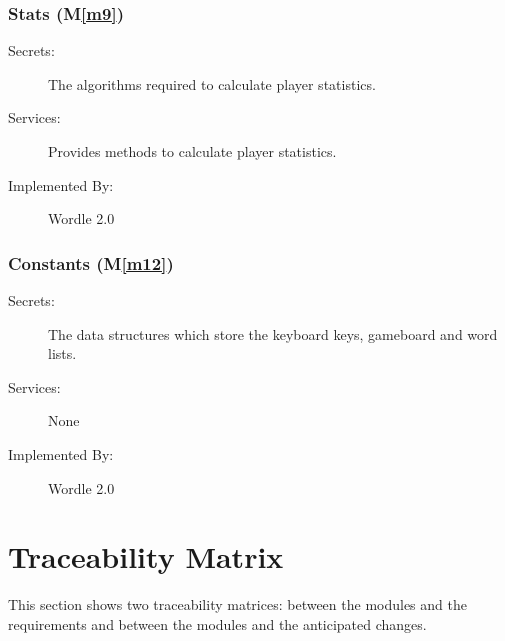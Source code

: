 \documentclass[12pt, titlepage]{article}
\newcommand{\mref}[1]{M\ref{#1}}
\begin{document}
	\subsubsection{Stats (\mref{m9})}
	\begin{description}
		\item[Secrets:]The algorithms required to calculate player statistics.
		\item[Services:]Provides methods to calculate player statistics.
		\item[Implemented By:] Wordle 2.0
	\end{description}
	
	\subsubsection{Constants (\mref{m12})}
	\begin{description}
		\item[Secrets:]The data structures which store the keyboard keys, gameboard and word lists.
		\item[Services:] None
		\item[Implemented By:] Wordle 2.0
	\end{description}
	
	\newpage
	
	\section{Traceability Matrix} \label{SecTM}
	
	This section shows two traceability matrices: between the modules and the
	requirements and between the modules and the anticipated changes.
	
\end{document}
